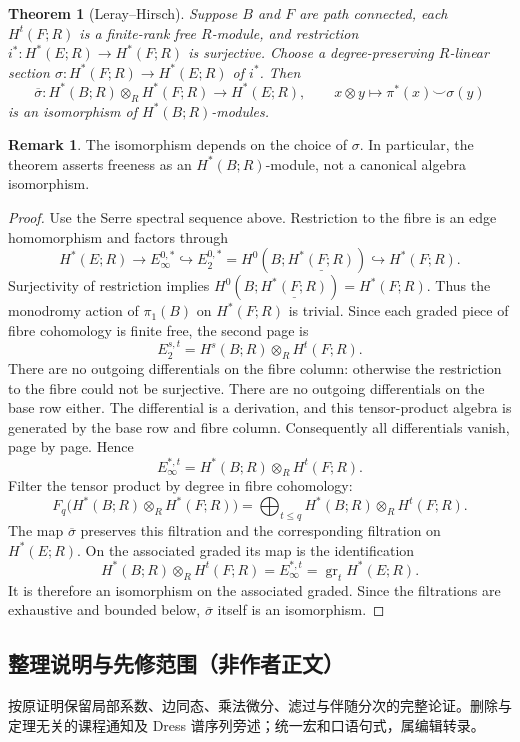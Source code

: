 \documentclass[UTF8,11pt]{ctexart}
\newtheorem*{theorem}{Theorem}
\theoremstyle{definition}
\newtheorem*{remark}{Remark}
\begin{document}
\begin{theorem}[Leray--Hirsch]
Suppose $B$ and $F$ are path connected, each $H^t(F;R)$ is a finite-rank free
$R$-module, and restriction $i^*:H^*(E;R)\to H^*(F;R)$ is surjective.
Choose a degree-preserving $R$-linear section
$\sigma:H^*(F;R)\to H^*(E;R)$ of $i^*$. Then
\[
 \overline\sigma:H^*(B;R)\otimes_RH^*(F;R)\longrightarrow H^*(E;R),
 \qquad x\otimes y\longmapsto\pi^*(x)\smile\sigma(y)
\]
is an isomorphism of $H^*(B;R)$-modules.
\end{theorem}
\begin{remark}
The isomorphism depends on the choice of $\sigma$. In particular, the theorem
asserts freeness as an $H^*(B;R)$-module, not a canonical algebra isomorphism.
\end{remark}
\begin{proof}
Use the Serre spectral sequence above. Restriction to the fibre is an edge
homomorphism and factors through
\[
 H^*(E;R)\longrightarrow E_\infty^{0,*}
 \hookrightarrow E_2^{0,*}=H^0(B;\underline{H^*(F;R)})
 \hookrightarrow H^*(F;R).
\]
Surjectivity of restriction implies
$H^0(B;\underline{H^*(F;R)})=H^*(F;R)$. Thus the monodromy action of
$\pi_1(B)$ on $H^*(F;R)$ is trivial. Since each graded piece of fibre
cohomology is finite free, the second page is
\[
 E_2^{s,t}=H^s(B;R)\otimes_R H^t(F;R).
\]
There are no outgoing differentials on the fibre column: otherwise the
restriction to the fibre could not be surjective. There are no outgoing
differentials on the base row either. The differential is a derivation,
and this tensor-product algebra is generated by the base row and fibre
column. Consequently all differentials vanish, page by page. Hence
\[
 E_
\infty^{*,t}=H^*(B;R)\otimes_RH^t(F;R).
\]
Filter the tensor product by degree in fibre cohomology:
\[
 F_q\bigl(H^*(B;R)\otimes_RH^*(F;R)\bigr)
   =\bigoplus_{t\leq q}H^*(B;R)\otimes_RH^t(F;R).
\]
The map $\overline\sigma$ preserves this filtration and the corresponding
filtration on $H^*(E;R)$. On the associated graded its map is the
identification
\[
 H^*(B;R)\otimes_RH^t(F;R)
   =E_\infty^{*,t}=\operatorname{gr}_tH^*(E;R).
\]
It is therefore an isomorphism on the associated graded. Since the
filtrations are exhaustive and bounded below, $\overline\sigma$ itself is
an isomorphism.
\end{proof}

\subsection*{整理说明与先修范围（非作者正文）}
按原证明保留局部系数、边同态、乘法微分、滤过与伴随分次的完整论证。删除与定理无关的课程通知及 Dress 谱序列旁述；统一宏和口语句式，属编辑转录。
\end{document}
